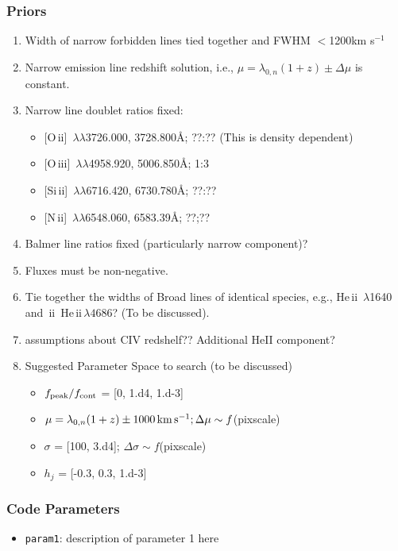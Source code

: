 \documentclass[12pt,letterpaper]{article}
\newcommand{\HeII}{\ifmmode {\rm He}\,{\sc ii}\,\lambda4686 \else 
	           He\,{\sc ii}\,$\lambda4686$\fi}
\newcommand{\heii}{He\,{\sc ii}}
\newcommand{\nii}{N\,{\sc ii}}
\newcommand{\oii}{O\,{\sc ii}}
\newcommand{\oiii}{O\,{\sc iii}}
\newcommand{\Sizw}{Si\,{\sc ii}}
\begin{document}
\subsubsection*{Priors}

  \begin{enumerate}
    \item Width of narrow forbidden lines tied together and FWHM $<$1200km s$^{-1}$
    \item Narrow emission line redshift solution, i.e., $\mu = \lambda_{0,n}(1+z)\pm \Delta \mu$ is constant.
    \item Narrow line doublet ratios fixed:
      \begin{itemize}
        \item {[\oii]\, $\lambda \lambda$3726.000, 3728.800\AA; ??:?? (This is density dependent)}
        \item {[\oiii]\, $\lambda \lambda$4958.920, 5006.850\AA;  1:3}
        \item {[\Sizw]\, $\lambda \lambda$6716.420, 6730.780\AA; ??:??}
        \item {[\nii]\, $\lambda \lambda$6548.060, 6583.39\AA; ??;??}
      \end{itemize}
    \item Balmer line ratios fixed (particularly narrow component)?
    \item Fluxes must be non-negative.
    \item Tie together the widths of Broad lines of identical species, e.g., \heii\, $\lambda$1640 and \HeII?  (To be discussed).
    \item assumptions about CIV redshelf?? Additional HeII component?
    \item Suggested Parameter Space to search (to be discussed)
      \begin{itemize}
        \item $f_{\rm peak}/f_{\rm cont}$ = [0, 1.d4, 1.d-3]
        \item $\mu = \lambda_{0,n}(1+z)\pm 1000\, {\rm km}\, {\rm s}^{-1}; \Delta \mu \sim f$(pixscale)
        \item $\sigma$ = [100, 3.d4]; $\Delta \sigma \sim f$(pixscale)
        \item $h_j$ = [-0.3, 0.3, 1.d-3]
      \end{itemize}

  \end{enumerate}

\subsubsection*{Code Parameters}

\begin{itemize}
    \item {\tt param1}: description of parameter 1 here
\end{itemize}






\end{document}
